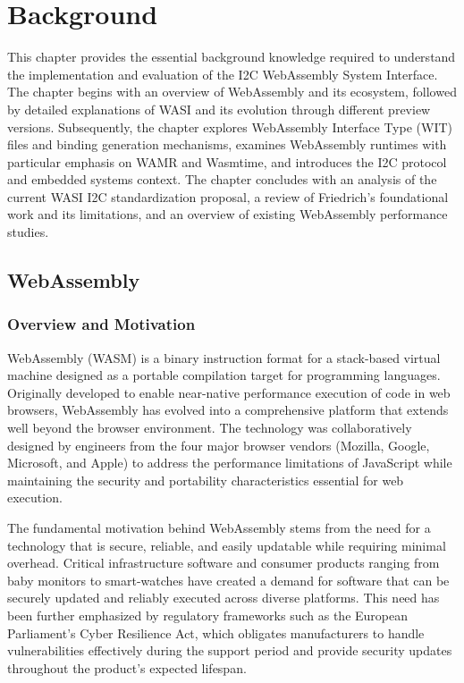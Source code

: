 \chapter{Background}
\label{chap:background}

This chapter provides the essential background knowledge required to understand the implementation and evaluation of the I2C WebAssembly System Interface. The chapter begins with an overview of WebAssembly and its ecosystem, followed by detailed explanations of WASI and its evolution through different preview versions. Subsequently, the chapter explores WebAssembly Interface Type (WIT) files and binding generation mechanisms, examines WebAssembly runtimes with particular emphasis on WAMR and Wasmtime, and introduces the I2C protocol and embedded systems context. The chapter concludes with an analysis of the current WASI I2C standardization proposal, a review of Friedrich's foundational work and its limitations, and an overview of existing WebAssembly performance studies.

\section{WebAssembly}
\label{sec:webassembly}

\subsection{Overview and Motivation}
\label{subsec:wasm-overview}

WebAssembly (WASM) is a binary instruction format for a stack-based virtual machine designed as a portable compilation target for programming languages\cite{haas2017webassembly}. Originally developed to enable near-native performance execution of code in web browsers, WebAssembly has evolved into a comprehensive platform that extends well beyond the browser environment. The technology was collaboratively designed by engineers from the four major browser vendors (Mozilla, Google, Microsoft, and Apple) to address the performance limitations of JavaScript while maintaining the security and portability characteristics essential for web execution.


The fundamental motivation behind WebAssembly stems from the need for a technology that is secure, reliable, and easily updatable while requiring minimal overhead\cite{friedrich_thesis}. Critical infrastructure software and consumer products ranging from baby monitors to smart-watches have created a demand for software that can be securely updated and reliably executed across diverse platforms. This need has been further emphasized by regulatory frameworks such as the European Parliament's Cyber Resilience Act, which obligates manufacturers to handle vulnerabilities effectively during the support period and provide security updates throughout the product's expected lifespan.

